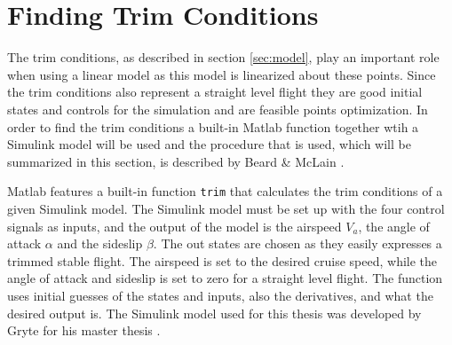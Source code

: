 \section{Finding Trim Conditions}

The trim conditions, as described in section \ref{sec:model}, play an important role when using a linear model as this model is linearized about these points. Since the trim conditions also represent a straight level flight they are good initial states and controls for the simulation and are feasible points optimization. In order to find the trim conditions a built-in Matlab function together wtih a Simulink model will be used and the procedure that is used, which will be summarized in this section, is described by Beard \& McLain \cite{uavBEARD}.

Matlab features a built-in function \texttt{trim} that calculates the trim conditions of a given Simulink model. The Simulink model must be set up with the four control signals as inputs, and the output of the model is the airspeed $V_a$, the angle of attack $\alpha$ and the sideslip $\beta$. The out states are chosen as they easily expresses a trimmed stable flight. The airspeed is set to the desired cruise speed, while the angle of attack and sideslip is set to zero for a straight level flight. The function uses initial guesses of the states and inputs, also the derivatives, and what the desired output is. The Simulink model used for this thesis was developed by Gryte for his master thesis \cite{GRYTE}.